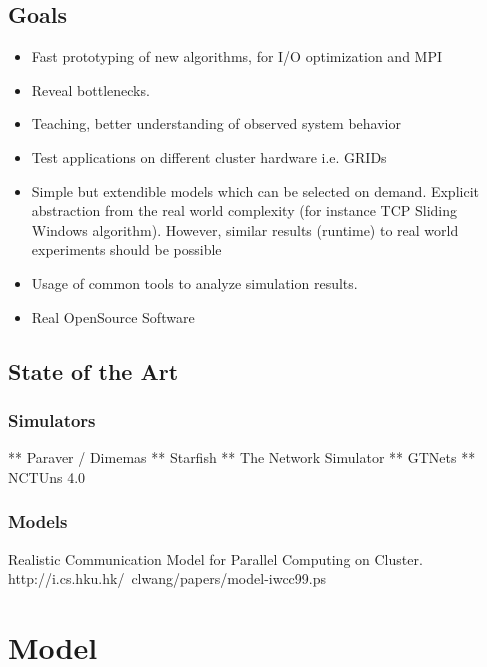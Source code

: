 \documentclass[
     11pt,         %
     a4paper,      %
     BCOR10mm,     %
     DIV14,        %
     liststotoc,   %
     bibtotoc,     %
     idxtotoc,     %
     parskip       %
     ]{scrreprt}   %
\begin{document}
\section{Goals}
\begin{itemize}
\item Fast prototyping of new algorithms, for I/O optimization and MPI
\item Reveal bottlenecks.
\item Teaching, better understanding of observed system behavior
\item Test applications on different cluster hardware i.e. GRIDs
\item Simple but extendible models which can be selected on demand.
   Explicit abstraction from the real world complexity (for instance TCP Sliding Windows algorithm).
   However, similar results (runtime) to real world experiments should be possible
\item Usage of common tools to analyze simulation results.
\item Real OpenSource Software
\end{itemize}

\section{State of the Art}
\subsection{Simulators}
** Paraver / Dimemas
** Starfish
** The Network Simulator
** GTNets
** NCTUns 4.0


\subsection{Models}
Realistic Communication Model for Parallel Computing on Cluster.
http://i.cs.hku.hk/~clwang/papers/model-iwcc99.ps



\chapter{Model}
\end{document}

